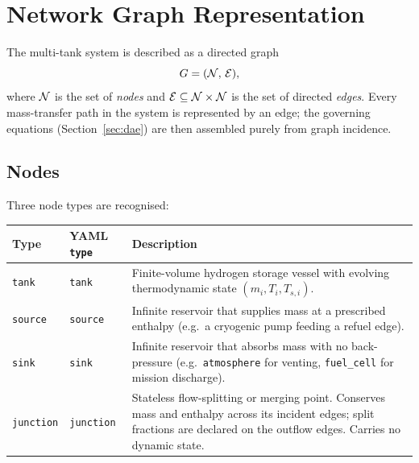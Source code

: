\section{Network Graph Representation}
\label{sec:network}

The multi-tank system is described as a directed graph
\begin{equation}
  G = (\mathcal{N},\, \mathcal{E}),
\end{equation}
where $\mathcal{N}$ is the set of \emph{nodes} and $\mathcal{E} \subseteq \mathcal{N}\times\mathcal{N}$
is the set of directed \emph{edges}.  Every mass-transfer path in the system is
represented by an edge; the governing equations (Section~\ref{sec:dae}) are then
assembled purely from graph incidence.

\subsection{Nodes}
\label{sec:network:nodes}

Three node types are recognised:

\begin{center}
\begin{tabularx}{\linewidth}{@{} l l X @{}}
\toprule
\textbf{Type} & \textbf{YAML \texttt{type}} & \textbf{Description} \\
\midrule
\texttt{tank}       & \texttt{tank}       &
  Finite-volume hydrogen storage vessel with evolving thermodynamic state
  $(m_i, T_i, T_{s,i})$. \\[4pt]
\texttt{source}     & \texttt{source}     &
  Infinite reservoir that supplies mass at a prescribed enthalpy (e.g.\ a
  cryogenic pump feeding a refuel edge). \\[4pt]
\texttt{sink}       & \texttt{sink}       &
  Infinite reservoir that absorbs mass with no back-pressure (e.g.\
  \texttt{atmosphere} for venting, \texttt{fuel\_cell} for mission discharge). \\[4pt]
\texttt{junction}   & \texttt{junction}   &
  Stateless flow-splitting or merging point.  Conserves mass and enthalpy
  across its incident edges; split fractions are declared on the outflow
  edges.  Carries no dynamic state. \\
\bottomrule
\end{tabularx}
\end{center}

